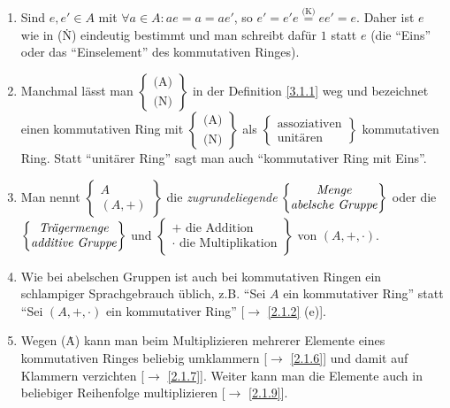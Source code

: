 \documentclass[../../main.tex]{subfiles}
\begin{document}
\begin{bem}\label{3.1.2}
\begin{enumerate}[\normalfont(a)]
\item Sind $e,e'\in A$ mit $\forall a\in A: ae =a = ae'$, so $e'=e'e\overset{\text{(\. K)}}=ee' = e$. Daher ist $e$ wie in (\. N) eindeutig bestimmt und man schreibt dafür $1$ statt $e$ (die "`Eins"' oder das "`Einselement"' des kommutativen Ringes).
\item Manchmal lässt man $\begin{Bmatrix}\text{(\. A)}\\\text{(\. N)}\end{Bmatrix}$ in der Definition \ref{3.1.1} weg und bezeichnet einen kommutativen Ring mit $\begin{Bmatrix}\text{(\. A)}\\\text{(\. N)}\end{Bmatrix}$ als $\begin{Bmatrix}\text{assoziativen}\\\text{unitären}\end{Bmatrix}$ kommutativen Ring. Statt "`unitärer Ring"' sagt man auch "`kommutativer Ring mit Eins"'.
\item Man nennt $\begin{Bmatrix}A\\(A,+)\end{Bmatrix}$ die \emph{zugrundeliegende}
$\begin{Bmatrix}\text{\emph{Menge}}\\\text{\emph{abelsche Gruppe}}\end{Bmatrix}$ oder die
$\begin{Bmatrix}\text{\emph{Trägermenge}}\index{kommutativer Ring@{\bf kommutativer Ring}!Trägermenge}\\\text{\emph{additive Gruppe}}\index{kommutativer Ring@{\bf kommutativer Ring}!additive Gruppe}\end{Bmatrix}$ und
$\begin{Bmatrix}+\text{ die Addition}\\\cdot\text{ die Multiplikation}\end{Bmatrix}$ von $(A,+,\cdot)$.
\item Wie bei abelschen Gruppen ist auch bei kommutativen Ringen ein schlampiger Sprachgebrauch üblich, z.B. "`Sei $A$ ein kommutativer Ring"' statt "`Sei $(A,+,\cdot)$ ein kommutativer Ring"' [$\to$ \ref{2.1.2} (e)].
\item Wegen (\. A) kann man beim Multiplizieren mehrerer Elemente eines kommutativen Ringes beliebig umklammern [$\to$ \ref{2.1.6}] und damit auf Klammern verzichten [$\to$ \ref{2.1.7}]. Weiter kann man die Elemente auch in beliebiger Reihenfolge multiplizieren [$\to$ \ref{2.1.9}].

\end{enumerate}
\end{bem}
\end{document}
